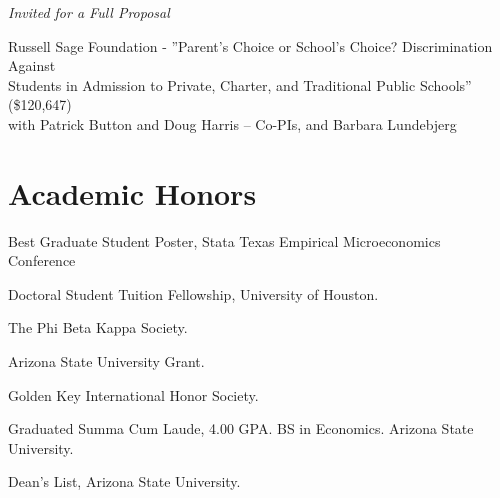\documentclass[letterpaper]{article}
\renewenvironment{itemize}{
  \begin{list}{}{
    \setlength{\leftmargin}{1.5em}
  }
}{
  \end{list}
}
\begin{document}
\vspace{2 mm}
\textit{Invited for a Full Proposal
}\begin{itemize}
  \item {}Russell Sage Foundation - ”Parent’s Choice or School’s Choice? Discrimination Against \\{\makebox[17mm]{\hfill}} Students in Admission to Private, Charter, and Traditional Public Schools” (\$120,647) \\{\makebox[17mm]{\hfill}}  with Patrick Button and Doug Harris – Co-PIs, and Barbara Lundebjerg
\end{itemize}

\section*{Academic Honors}
\vspace{2 mm}
\begin{itemize}
\item {} Best Graduate Student Poster, Stata Texas Empirical Microeconomics Conference
\item {} Doctoral Student Tuition Fellowship, University of Houston. 
\item {} The Phi Beta Kappa Society. 
\item {} Arizona State University Grant. 
\item {} Golden Key International Honor Society. 
\item {} Graduated Summa Cum Laude, 4.00 GPA. BS in Economics. Arizona State University. 
\item {} Dean's List, Arizona State University. 
\end{itemize}
\vspace{2 mm}
\end{document}
